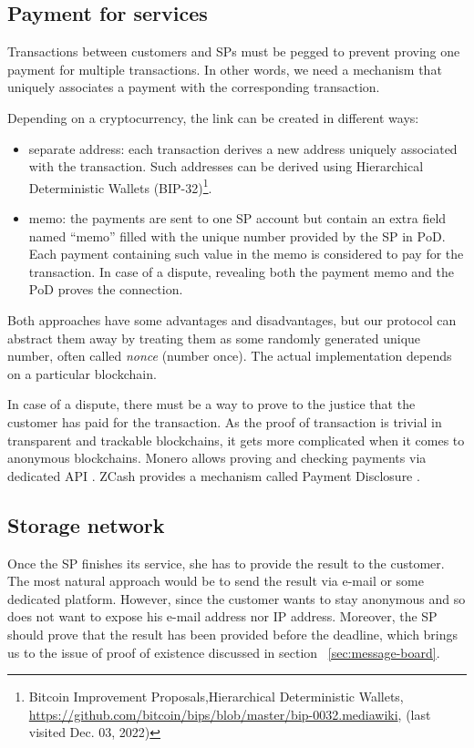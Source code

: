 \documentclass{ieeeaccess}
\begin{document}
\subsection{Payment for services}\label{payment-for-services}
Transactions between customers and SPs must be pegged to prevent proving one payment for multiple transactions. In other
words, we need a mechanism that uniquely associates a payment with the corresponding transaction.

Depending on a cryptocurrency, the link can be created in different
ways:
\begin{itemize}

\item separate address: each transaction derives a new address uniquely associated with the transaction. Such addresses can be derived using Hierarchical Deterministic Wallets (BIP-32)\footnote{Bitcoin Improvement Proposals,Hierarchical Deterministic Wallets, \url{https://github.com/bitcoin/bips/blob/master/bip-0032.mediawiki}, (last visited Dec. 03, 2022)}.
\item memo: the payments are sent to one SP account but contain an extra field named ``memo'' filled with the unique number provided by the SP in $\mathrm{PoD}$. Each payment containing such value in the memo is considered to pay for the transaction. In case of a dispute, revealing both the payment memo and the $\mathrm{PoD}$ proves the connection.
\end{itemize}

Both approaches have some advantages and disadvantages, but our protocol can abstract them away by treating them as some randomly generated unique number, often called \textit{nonce} (number once). The actual implementation depends on a particular blockchain.

In case of a dispute, there must be a way to prove to the justice that the customer has paid for the transaction. As the proof of transaction is trivial in transparent and trackable blockchains, it gets more complicated when it comes to anonymous blockchains. Monero allows proving and checking payments via dedicated API \cite{MoneroHowProve}. ZCash provides a mechanism called Payment Disclosure \cite{daviesIntroductionPaymentDisclosure2017}.

\subsection{Storage network}\label{storage-network}
Once the SP finishes its service, she has to provide the result to the customer. The most natural approach would be to send the result via e-mail or some dedicated platform. However, since the customer wants to stay anonymous and so does not want to expose his e-mail address nor IP address. Moreover, the SP should prove that the result has been provided before the deadline, which brings us to the issue of proof of existence discussed in section ~\ref{sec:message-board}.
\end{document}
